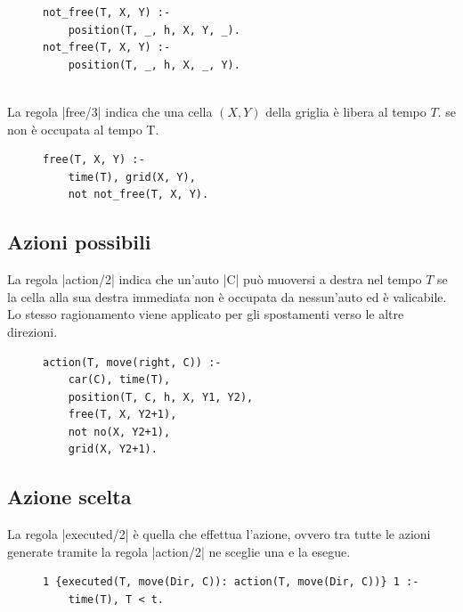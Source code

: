 \documentclass[10pt, a4paper, oneside]{article}
\begin{document}
\begin{figure}[H]
\centering
\begin{verbatim}
not_free(T, X, Y) :-
    position(T, _, h, X, Y, _).
not_free(T, X, Y) :-
    position(T, _, h, X, _, Y).
\end{verbatim}
\end{figure}

\noindent
\\La regola |free/3| indica che una cella $(X,Y)$ della griglia è libera al tempo $T$.
se non è occupata al tempo T.

\begin{figure}[H]
\centering
\begin{verbatim}
free(T, X, Y) :-
    time(T), grid(X, Y),
    not not_free(T, X, Y).
\end{verbatim}
\end{figure}



\subsection{Azioni possibili}
La regola |action/2| indica che un'auto |C| può muoversi a destra nel tempo $T$ se la cella alla sua destra immediata non è occupata da nessun'auto ed è valicabile. Lo stesso ragionamento viene applicato per gli spostamenti verso le altre direzioni.

\begin{figure}[H]
\centering
\begin{verbatim}
action(T, move(right, C)) :-
    car(C), time(T),
    position(T, C, h, X, Y1, Y2),
    free(T, X, Y2+1),
    not no(X, Y2+1),
    grid(X, Y2+1).
\end{verbatim}
\end{figure}


\subsection{Azione scelta}
La regola |executed/2| è quella che effettua l'azione, ovvero tra tutte le azioni generate tramite la regola |action/2| ne sceglie una e la esegue.

\begin{figure}[H]
\centering
\begin{verbatim}
1 {executed(T, move(Dir, C)): action(T, move(Dir, C))} 1 :-
    time(T), T < t.
\end{verbatim}
\end{figure}
\end{document}
